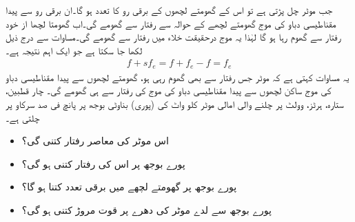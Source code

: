 جب موٹر چل پڑتی ہے تو اس کے گھومتے لچھوں کے برقی رو کا تعدد  ہو گا۔ان برقی رو سے پیدا مقناطیسی دباو کی موج گھومتے لچھے کے حوالہ سے  رفتار سے گھومے گی۔اب گھومتا لچھا از خود  رفتار   سے گھوم رہا ہو گا لہٰذا یہ موج درحقیقت خلاء میں  رفتار سے گھومے گی۔مساوات   سے درج ذیل لکھا جا سکتا ہے جو ایک اہم نتیجہ ہے۔
\begin{align}
f+s f_e=f +f_e-f=f_e
\end{align} 
 یہ مساوات کہتی ہے کہ موٹر جس رفتار سے بھی گھوم رہی ہو، گھومتے لچھوں سے پیدا مقناطیسی دباو کی موج ساکن لچھوں سے پیدا مقناطیسی دباو کی موج کی رفتار سے ہی گھومے گی۔
%
 چار قطبین، ستارہ،  ہرٹز،  وولٹ  پر چلنے والی امالی موٹر  کلو واٹ کی (پوری) بناوٹی بوجھ پر پانچ فی صد سرکاو پر چلتی ہے۔
\begin{itemize}
\item
اس موٹر کی معاصر رفتار کتنی گی؟
\item
پورے بوجھ پر اس کی رفتار کتنی ہو گی؟
\item
پورے بوجھ پر گھومتے لچھے میں برقی تعدد کتنا ہو گا؟
\item
پورے بوجھ سے لدے موٹر کی دھرے پر قوت مروڑ کتنی ہو گی؟
\end{itemize}

